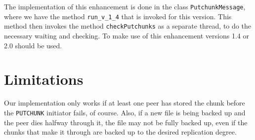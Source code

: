 \documentclass[11pt,a4paper,reqno]{report}
\numberwithin{equation}{section}
\begin{document}
The implementation of this enhancement is done in the class \verb!PutchunkMessage!, where we have the method \verb!run_v_1_4! that is invoked for this version. This method then invokes the method \verb!checkPutchunks! as a separate thread, to do the necessary waiting and checking. To make use of this enhancement versions 1.4 or 2.0 should be used.

\section{Limitations}

Our implementation only works if at least one peer has stored the chunk before the \verb!PUTCHUNK! initiator fails, of course. Also, if a new file is being backed up and the peer dies halfway through it, the file may not be fully backed up, even if the chunks that make it through are backed up to the desired replication degree.
\end{document}
